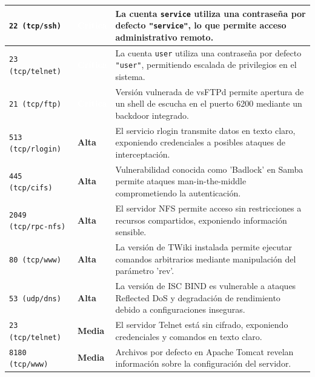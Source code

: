\documentclass[11pt,oneside,a4paper]{book}
\begin{document}
\begin{longtable}{|p{3.5cm}|p{2cm}|p{8cm}|}
\texttt{22 (tcp/ssh)} & \cellcolor{Critical}\textbf{\textcolor{white}{Crítica}} & La cuenta \texttt{service} utiliza una contraseña por defecto \texttt{"service"}, lo que permite acceso administrativo remoto. \\ \hline

\texttt{23 (tcp/telnet)} & \cellcolor{Critical}\textbf{\textcolor{white}{Crítica}} & La cuenta \texttt{user} utiliza una contraseña por defecto \texttt{"user"}, permitiendo escalada de privilegios en el sistema. \\ \hline

\texttt{21 (tcp/ftp)} & \cellcolor{Critical}\textbf{\textcolor{white}{Crítica}} & Versión vulnerada de vsFTPd permite apertura de un shell de escucha en el puerto 6200 mediante un backdoor integrado. \\ \hline

\texttt{513 (tcp/rlogin)} & \cellcolor{High}\textbf{Alta} & El servicio rlogin transmite datos en texto claro, exponiendo credenciales a posibles ataques de interceptación. \\ \hline

\texttt{445 (tcp/cifs)} & \cellcolor{High}\textbf{Alta} & Vulnerabilidad conocida como 'Badlock' en Samba permite ataques man-in-the-middle comprometiendo la autenticación. \\ \hline

\texttt{2049 (tcp/rpc-nfs)} & \cellcolor{High}\textbf{Alta} & El servidor NFS permite acceso sin restricciones a recursos compartidos, exponiendo información sensible. \\ \hline

\texttt{80 (tcp/www)} & \cellcolor{High}\textbf{Alta} & La versión de TWiki instalada permite ejecutar comandos arbitrarios mediante manipulación del parámetro 'rev'. \\ \hline

\texttt{53 (udp/dns)} & \cellcolor{High}\textbf{Alta} & La versión de ISC BIND es vulnerable a ataques Reflected DoS y degradación de rendimiento debido a configuraciones inseguras. \\ \hline

\texttt{23 (tcp/telnet)} & \cellcolor{Medium}\textbf{Media} & El servidor Telnet está sin cifrado, exponiendo credenciales y comandos en texto claro. \\ \hline

\texttt{8180 (tcp/www)} & \cellcolor{Medium}\textbf{Media} & Archivos por defecto en Apache Tomcat revelan información sobre la configuración del servidor. \\ \hline


\end{longtable}
\end{document}
